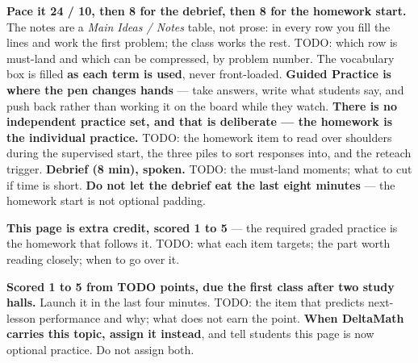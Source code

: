 \documentclass[10pt]{article}
\begin{document}
\begin{teachernote}
\textbf{Pace it 24 / 10, then 8 for the debrief, then 8 for the homework start.} The notes are
a \emph{Main Ideas / Notes} table, not prose: in every row you fill the lines and work the first
problem; the class works the rest. TODO: which row is must-land and which can be compressed,
by problem number. The vocabulary box is filled
\textbf{as each term is used}, never front-loaded.
\textbf{Guided Practice is where the pen changes hands} --- take answers, write what students
say, and push back rather than working it on the board while they watch.
\textbf{There is no independent practice set, and that is deliberate --- the homework is the
individual practice.} TODO: the homework item to read over shoulders during the supervised start,
the three piles to sort responses into, and the reteach trigger.
\textbf{Debrief (8 min), spoken.} TODO: the must-land moments; what to cut if time is short.
\textbf{Do not let the debrief eat the last eight minutes} --- the homework start is not
optional padding.
\end{teachernote}

\begin{teachernote}[AP Practice]
\textbf{This page is extra credit, scored 1 to 5} --- the required graded practice is the homework that follows it. TODO:
what each item targets; the part worth reading closely; when to go over it.
\end{teachernote}

\begin{teachernote}[Homework]
\textbf{Scored 1 to 5 from TODO points, due the first class after two study halls.} Launch it in the last four minutes.
TODO: the item that predicts next-lesson performance and why; what does not earn the point.
\textbf{When DeltaMath carries this topic, assign it instead}, and tell students this page is now optional practice. Do not assign both.
\end{teachernote}
\end{document}
